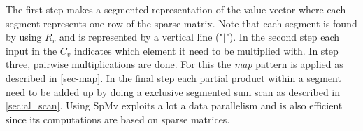 \begin{center}
	\label{alg-mulex}
\end{center}
The first step makes a segmented representation of the value vector where each segment represents one row of the sparse matrix.
Note that each segment is found by using $R_v$ and is represented by a vertical line ("$|$").
In the second step each input in the $C_v$ indicates which element it need to be multiplied with.
In step three, pairwise multiplications are done.
For this the \textit{map} pattern is applied as described in \autoref{sec-map}.
In the final step each partial product within a segment need to be added up by doing a exclusive segmented sum scan as described in \autoref{sec:al_scan}.
Using SpMv exploits a lot a data parallelism and is also efficient since its computations are based on sparse matrices.